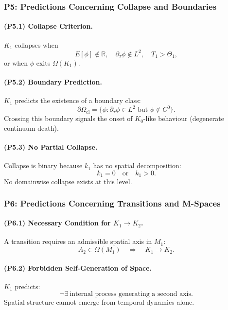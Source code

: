 \subsubsection{P5: Predictions Concerning Collapse and Boundaries}

\paragraph{(P5.1) Collapse Criterion.}
$K_1$ collapses when
\[
E[\phi] \notin \mathbb{R},\quad
\partial_\tau \phi \notin L^2,\quad
T_1 > \Theta_1,
\]
or when $\phi$ exits $\Omega(K_1)$.

\paragraph{(P5.2) Boundary Prediction.}
$K_1$ predicts the existence of a boundary class:
\[
\partial\Omega_{\mathrm{cl}} = 
\{ \phi : \partial_\tau \phi \in L^2 \text{ but } \phi \notin C^0 \}.
\]
Crossing this boundary signals the onset of $K_0$-like behaviour (degenerate
continuum death).

\paragraph{(P5.3) No Partial Collapse.}
Collapse is binary because $k_1$ has no spatial decomposition:
\[
k_1 = 0\quad \text{or}\quad k_1 > 0.
\]
No domainwise collapse exists at this level.

\subsubsection{P6: Predictions Concerning Transitions and M-Spaces}

\paragraph{(P6.1) Necessary Condition for \texorpdfstring{$K_1 \to K_2$}{K_1 \to K_2}.}
A transition requires an admissible spatial axis in $M_1$:
\[
A_2 \in \Omega(M_1)
\quad\Rightarrow\quad K_1\to K_2.
\]

\paragraph{(P6.2) Forbidden Self-Generation of Space.}
$K_1$ predicts:
\[
\neg\exists\ \text{internal process generating a second axis}.
\]
Spatial structure cannot emerge from temporal dynamics alone.

